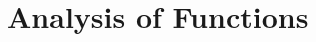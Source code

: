 \documentclass[main.tex]{subfiles}
\begin{document}
	\chapter{Analysis of Functions}		
\end{document}

